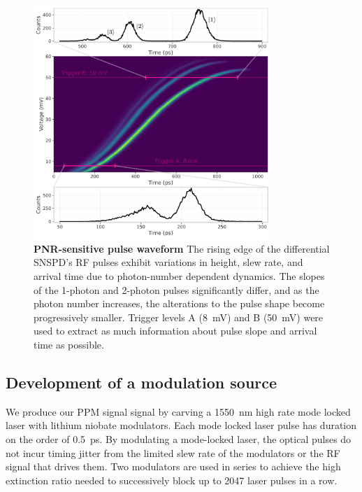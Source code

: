\documentclass[11pt]{caltech_thesis} %
\begin{document}
\hypertarget{fig:waveform}{%
\begin{figure}
\centering
\includegraphics[width=0.8\textwidth,height=\textheight]{./chapter_04/figs/waveform_light.pdf}
\caption[{PNR-sensitive pulse waveform}]{\textbf{PNR-sensitive pulse waveform} The rising edge of the differential SNSPD's RF pulses exhibit variations in height, slew rate, and arrival time due to photon-number dependent dynamics. The slopes of the 1-photon and 2-photon pulses significantly differ, and as the photon number increases, the alterations to the pulse shape become progressively smaller. Trigger levels A (8~mV) and B (50~mV) were used to extract as much information about pulse slope and arrival time as possible.}
\label{fig:waveform}
\end{figure}
}

\hypertarget{development-of-a-modulation-source}{%
\subsection{Development of a modulation source}\label{development-of-a-modulation-source}}

We produce our PPM signal signal by carving a 1550~nm high rate mode locked laser with lithium niobate modulators. Each mode locked laser pulse has duration on the order of 0.5~ps. By modulating a mode-locked laser,
the optical pulses do not incur timing jitter from the limited slew rate of the modulators or the RF signal that drives them. Two modulators are used in series to achieve the high extinction ratio needed to successively block up to 2047 laser pulses in a row.
\end{document}
